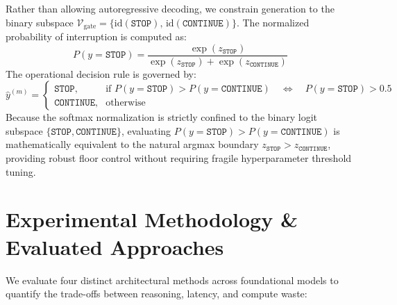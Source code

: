 \documentclass{article}
\begin{document}
Rather than allowing autoregressive decoding, we constrain generation to the binary subspace $\mathcal{V}_{\text{gate}} = \{ \text{id}(\texttt{STOP}), \, \text{id}(\texttt{CONTINUE}) \}$. The normalized probability of interruption is computed as:
\begin{equation}
P(y = \texttt{STOP}) = \frac{\exp(z_{\texttt{STOP}})}{\exp(z_{\texttt{STOP}}) + \exp(z_{\texttt{CONTINUE}})}
\end{equation}
The operational decision rule is governed by:
\begin{equation}
\hat{y}^{(m)} = \begin{cases} 
\texttt{STOP}, & \text{if } P(y = \texttt{STOP}) > P(y = \texttt{CONTINUE}) \quad \iff \quad P(y = \texttt{STOP}) > 0.5 \\
\texttt{CONTINUE}, & \text{otherwise}
\end{cases}
\label{eq:decision_rule}
\end{equation}
Because the softmax normalization is strictly confined to the binary logit subspace $\{\texttt{STOP}, \texttt{CONTINUE}\}$, evaluating $P(y = \texttt{STOP}) > P(y = \texttt{CONTINUE})$ is mathematically equivalent to the natural argmax boundary $z_{\texttt{STOP}} > z_{\texttt{CONTINUE}}$, providing robust floor control without requiring fragile hyperparameter threshold tuning.

\section{Experimental Methodology \& Evaluated Approaches}

We evaluate four distinct architectural methods across foundational models to quantify the trade-offs between reasoning, latency, and compute waste:
\end{document}
